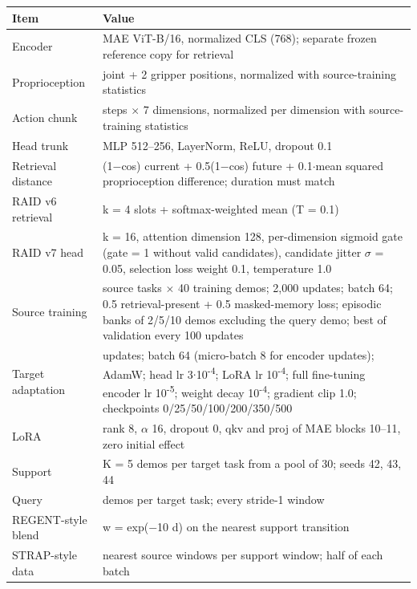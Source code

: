 \documentclass[11pt,a4paper]{article}
\begin{document}
{\def\LTcaptype{none} %
{\small
\begin{longtable}[]{@{}
  >{\raggedright\arraybackslash}p{}
  >{\raggedright\arraybackslash}p{}@{}}
\toprule\noalign{}
\begin{minipage}[b]{\linewidth}\raggedright
Item
\end{minipage} & \begin{minipage}[b]{\linewidth}\raggedright
Value
\end{minipage} \\
\midrule\noalign{}
\endhead
\bottomrule\noalign{}
\endlastfoot
Encoder & MAE ViT-B/16, normalized CLS (768); separate frozen reference copy for retrieval \\
Proprioception & 7 joint + 2 gripper positions, normalized with source-training statistics \\
Action chunk & 8 steps \ensuremath{\times} 7 dimensions, normalized per dimension with source-training statistics \\
Head trunk & MLP 512--256, LayerNorm, ReLU, dropout 0.1 \\
Retrieval distance & 0.5(1\ensuremath{-}cos) current + 0.5(1\ensuremath{-}cos) future + 0.1\ensuremath{\cdot}mean squared proprioception difference; duration must match \\
RAID v6 retrieval & k = 4 slots + softmax-weighted mean (T = 0.1) \\
RAID v7 head & k = 16, attention dimension 128, per-dimension sigmoid gate (gate = 1 without valid candidates), candidate jitter \ensuremath{\sigma} = 0.05, selection loss weight 0.1, temperature 1.0 \\
Source training & 6 source tasks \ensuremath{\times} 40 training demos; 2,000 updates; batch 64; 0.5 retrieval-present + 0.5 masked-memory loss; episodic banks of 2/5/10 demos excluding the query demo; best of validation every 100 updates \\
Target adaptation & 500 updates; batch 64 (micro-batch 8 for encoder updates); AdamW; head lr 3\ensuremath{\cdot}10\textsuperscript{-4}; LoRA lr 10\textsuperscript{-4}; full fine-tuning encoder lr 10\textsuperscript{-5}; weight decay 10\textsuperscript{-4}; gradient clip 1.0; checkpoints 0/25/50/100/200/350/500 \\
LoRA & rank 8, \ensuremath{\alpha} 16, dropout 0, qkv and proj of MAE blocks 10--11, zero initial effect \\
Support & K = 5 demos per target task from a pool of 30; seeds 42, 43, 44 \\
Query & 20 demos per target task; every stride-1 window \\
REGENT-style blend & w = exp(\ensuremath{-}10 d) on the nearest support transition \\
STRAP-style data & 4 nearest source windows per support window; half of each batch \\
\end{longtable}
}
}
\end{document}
